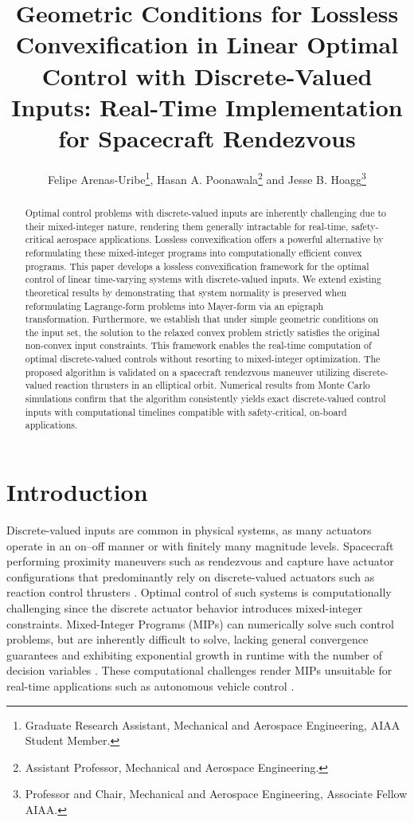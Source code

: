 \documentclass[conf]{new-aiaa}
\title{Geometric Conditions for Lossless Convexification in Linear Optimal Control with Discrete-Valued Inputs: Real-Time Implementation for Spacecraft Rendezvous}
\author{Felipe Arenas-Uribe\footnote{Graduate Research Assistant, Mechanical and Aerospace Engineering, AIAA Student Member.}, Hasan A. Poonawala\footnote{Assistant Professor, Mechanical and Aerospace Engineering.} and Jesse B. Hoagg\footnote{Professor and Chair, Mechanical and Aerospace Engineering, Associate Fellow AIAA.}}
\affil{University of Kentucky, Lexington, Kentucky, 40506}
\begin{document}
\maketitle

\begin{abstract}
    Optimal control problems with discrete-valued inputs are inherently challenging due to their mixed-integer nature, rendering them generally intractable for real-time, safety-critical aerospace applications. Lossless convexification offers a powerful alternative by reformulating these mixed-integer programs into computationally efficient convex programs. This paper develops a lossless convexification framework for the optimal control of linear time-varying systems with discrete-valued inputs. We extend existing theoretical results by demonstrating that system normality is preserved when reformulating Lagrange-form problems into Mayer-form via an epigraph transformation. Furthermore, we establish that under simple geometric conditions on the input set, the solution to the relaxed convex problem strictly satisfies the original non-convex input constraints. This framework enables the real-time computation of optimal discrete-valued controls without resorting to mixed-integer optimization. The proposed algorithm is validated on a spacecraft rendezvous maneuver utilizing discrete-valued reaction thrusters in an elliptical orbit. Numerical results from Monte Carlo simulations confirm that the algorithm consistently yields exact discrete-valued control inputs with computational timelines compatible with safety-critical, on-board applications.
\end{abstract}

\section{Introduction}

Discrete-valued inputs are common in physical systems, as many actuators operate in an on–off manner or with finitely many magnitude levels. Spacecraft performing proximity maneuvers such as rendezvous and capture have actuator configurations that predominantly rely on discrete-valued actuators such as reaction control thrusters \cite{pasand_study_2017}. Optimal control of such systems is computationally challenging since the discrete actuator behavior introduces mixed-integer constraints. Mixed-Integer Programs (MIPs) can numerically solve such control problems, but are inherently difficult to solve, lacking general convergence guarantees and exhibiting exponential growth in runtime with the number of decision variables \cite{junger_mixed_2013}. These computational challenges render MIPs unsuitable for real-time applications such as autonomous vehicle control \cite{malyuta_advances_2021}.
\end{document}
